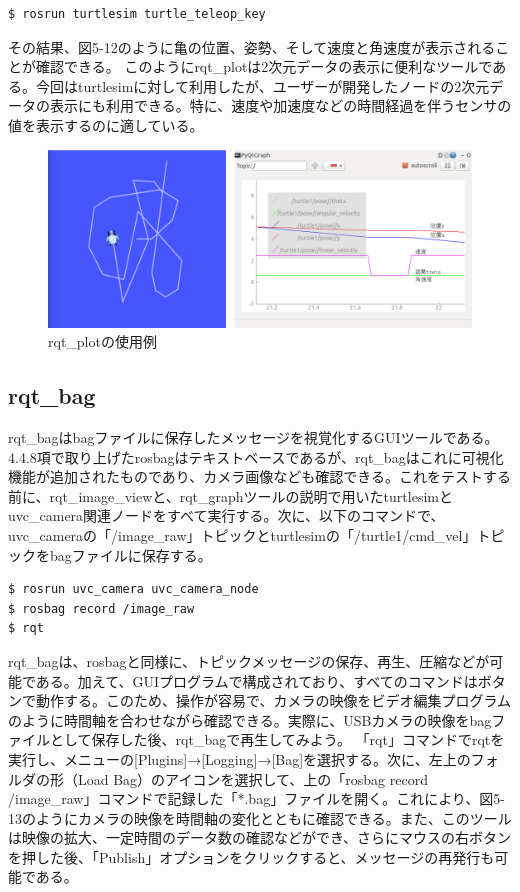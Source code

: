 \begin{lstlisting}[language=ROS]
$ rosrun turtlesim turtle_teleop_key
\end{lstlisting}

その結果、図5-12のように亀の位置、姿勢、そして速度と角速度が表示されることが確認できる。
このようにrqt\_plotは2次元データの表示に便利なツールである。今回はturtlesimに対して利用したが、ユーザーが開発したノードの2次元データの表示にも利用できる。特に、速度や加速度などの時間経過を伴うセンサの値を表示するのに適している。

\begin{figure}[htp]
  \centering
  \includegraphics[width=\columnwidth]{pictures/chapter5/pic_05_12.png}
  \caption{rqt\_plotの使用例}
\end{figure}

\subsection{rqt\_bag}

rqt\_bagはbagファイルに保存したメッセージを視覚化するGUIツールである。4.4.8項で取り上げたrosbagはテキストベースであるが、rqt\_bagはこれに可視化機能が追加されたものであり、カメラ画像なども確認できる。これをテストする前に、rqt\_image\_viewと、rqt\_graphツールの説明で用いたturtlesimとuvc\_camera関連ノードをすべて実行する。次に、以下のコマンドで、uvc\_cameraの「/image\_raw」トピックとturtlesimの「/turtle1/cmd\_vel」トピックをbagファイルに保存する。

\begin{lstlisting}[language=ROS]
$ rosrun uvc_camera uvc_camera_node
$ rosbag record /image_raw
$ rqt
\end{lstlisting}

rqt\_bagは、rosbagと同様に、トピックメッセージの保存、再生、圧縮などが可能である。加えて、GUIプログラムで構成されており、すべてのコマンドはボタンで動作する。このため、操作が容易で、カメラの映像をビデオ編集プログラムのように時間軸を合わせながら確認できる。実際に、USBカメラの映像をbagファイルとして保存した後、rqt\_bagで再生してみよう。
「rqt」コマンドでrqtを実行し、メニューの[Plugins]→[Logging]→[Bag]を選択する。次に、左上のフォルダの形（Load Bag）のアイコンを選択して、上の「rosbag record /image\_raw」コマンドで記録した「*.bag」ファイルを開く。これにより、図5-13のようにカメラの映像を時間軸の変化とともに確認できる。また、このツールは映像の拡大、一定時間のデータ数の確認などができ、さらにマウスの右ボタンを押した後、「Publish」オプションをクリックすると、メッセージの再発行も可能である。

